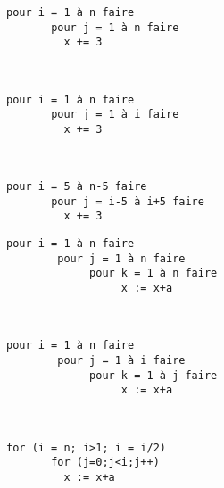 \documentclass[10pt]{article}\usepackage[correction]{esial}
\begin{document}
\noindent\begin{minipage}{.3\linewidth}
  \begin{Verbatim}[gobble=4,label=listing 1]
    pour i = 1 à n faire
       pour j = 1 à n faire
         x += 3
  \end{Verbatim}  
\end{minipage}~~~~\begin{minipage}{.3\linewidth}
  \begin{Verbatim}[gobble=4,label=listing 2]
    pour i = 1 à n faire
       pour j = 1 à i faire
         x += 3    
  \end{Verbatim}
\end{minipage}~~~~\begin{minipage}{.3\linewidth}
  \begin{Verbatim}[gobble=4,label=listing 3]
    pour i = 5 à n-5 faire
       pour j = i-5 à i+5 faire
         x += 3    
  \end{Verbatim}
\end{minipage}

\medskip\noindent\begin{minipage}{.3\linewidth}
\begin{Verbatim}[gobble=4,label=listing 4]
    pour i = 1 à n faire 
        pour j = 1 à n faire 
             pour k = 1 à n faire 
                  x := x+a
\end{Verbatim}
\end{minipage}~~~~\begin{minipage}{.3\linewidth}
\begin{Verbatim}[gobble=4,label=listing 5]
    pour i = 1 à n faire 
        pour j = 1 à i faire 
             pour k = 1 à j faire 
                  x := x+a
\end{Verbatim}
\end{minipage}~~~~\begin{minipage}{.3\linewidth}
\begin{Verbatim}[gobble=4,label=listing 6]
    for (i = n; i>1; i = i/2)
       for (j=0;j<i;j++)
         x := x+a
\end{Verbatim}
\end{minipage}
\end{document}

